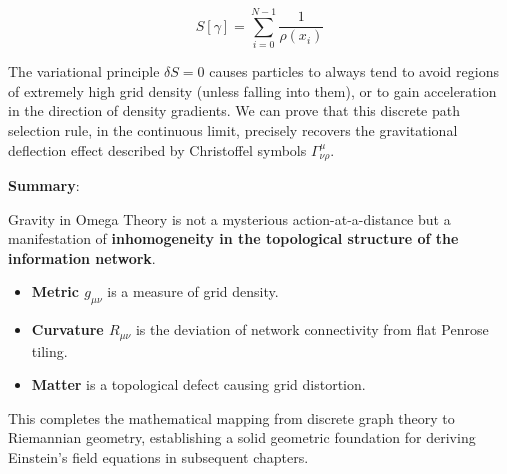 \[S[\gamma] = \sum_{i=0}^{N-1} \frac{1}{\rho(x_i)}\]

The variational principle $\delta S = 0$ causes particles to always tend to avoid regions of extremely high grid density (unless falling into them), or to gain acceleration in the direction of density gradients.
We can prove that this discrete path selection rule, in the continuous limit, precisely recovers the gravitational deflection effect described by Christoffel symbols $\Gamma^\mu_{\nu\rho}$.

\textbf{Summary}:

Gravity in Omega Theory is not a mysterious action-at-a-distance but a manifestation of \textbf{inhomogeneity in the topological structure of the information network}.

\begin{itemize}
\item \textbf{Metric $g_{\mu\nu}$} is a measure of grid density.
\item \textbf{Curvature $R_{\mu\nu}$} is the deviation of network connectivity from flat Penrose tiling.
\item \textbf{Matter} is a topological defect causing grid distortion.
\end{itemize}

This completes the mathematical mapping from discrete graph theory to Riemannian geometry, establishing a solid geometric foundation for deriving Einstein's field equations in subsequent chapters.
